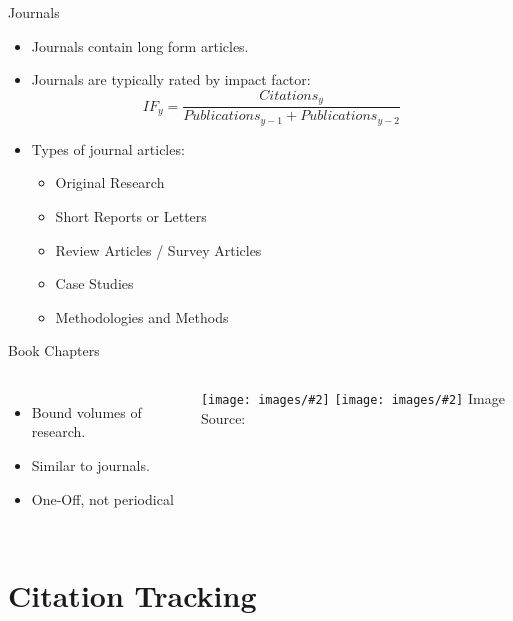 \documentclass[handout]{beamer}
\makeatletter
\newcommand{\image}[3][\@nil]{%
        \def\tmp{#1}%
        \begin{center}
        \ifx\tmp\@nnil
            \texttt{[image: images/\#2]}
        \else
            \texttt{[image: images/\#2]}
            \linebreak
            #1
        \fi
        \linebreak
        {\tiny Image Source:\thinspace{\tiny #3}}
        \end{center}
}
\makeatother
\begin{document}
\begin{frame}{Journals}
    \begin{itemize}
        \item Journals contain long form articles.
        \item Journals are typically rated by impact factor:
        \[
        IF_y = \dfrac{Citations_y}{Publications_{y-1}+Publications_{y-2}}
        \]
        \item Types of journal articles:
        \begin{itemize}
            \item Original Research
            \item Short Reports or Letters
            \item Review Articles / Survey Articles
            \item Case Studies
            \item Methodologies and Methods
        \end{itemize}
    \end{itemize}
\end{frame}

\begin{frame}{Book Chapters}
    \begin{columns}
    
    \begin{itemize}
        \item Bound volumes of research.
        \item Similar to journals.
        \item One-Off, not periodical
    \end{itemize}
    
    \image{recent-trends}{Springer}
    
    \end{columns}
\end{frame}

\section{Citation Tracking}
\end{document}
